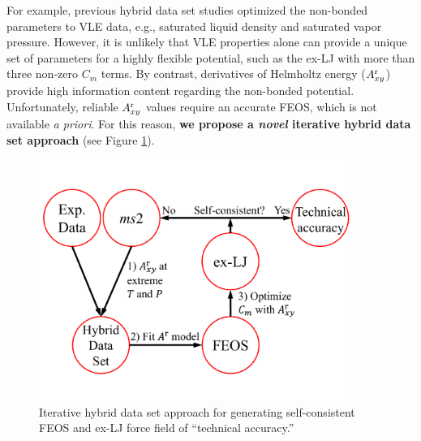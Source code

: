\documentclass[12pt,a4paper]{article}
\begin{document}

For example, previous hybrid data set studies optimized the non-bonded parameters to VLE data, e.g., saturated liquid density and saturated vapor pressure. However, it is unlikely that VLE properties alone can provide a unique set of parameters for a highly flexible potential, such as the ex-LJ with more than three non-zero $C_m$ terms. By contrast, derivatives of Helmholtz energy ($A_{xy}^{\rm r}$) provide high information content regarding the non-bonded potential. Unfortunately, reliable $A_{xy}^{\rm r}$ values require an accurate FEOS, which is not available \textit{a priori}. For this reason, \textbf{we propose a \textit{novel} iterative hybrid data set approach} (see Figure \ref{FlowChart}).



\begin{figure}[htb!]
	\centering
	\includegraphics[width=4.0in]{FlowChart.pdf}
	\caption{Iterative hybrid data set approach for generating self-consistent FEOS and ex-LJ force field of ``technical accuracy.''}
	\label{FlowChart}
\end{figure}
\end{document}
